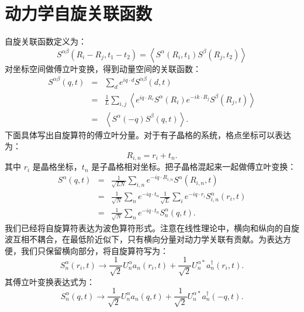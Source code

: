 \documentclass[UTF8]{ctexart}
\begin{document}
\section*{动力学自旋关联函数}
\noindent
自旋关联函数定义为：
\begin{equation}
S^{\alpha\beta}\left(R_{i}-R_{j},t_{1}-t_{2}\right)=\left\langle S^{\alpha}\left(R_{i},t_{1}\right)S^{\beta}\left(R_{j},t_{2}\right)\right\rangle 
\end{equation}
对坐标空间做傅立叶变换，得到动量空间的关联函数：
\begin{eqnarray}
S^{\alpha\beta}\left(q,t\right) & = & \sum_{d}e^{iq\cdot d}S^{\alpha\beta}\left(d,t\right)\nonumber \\
 & = & \frac{1}{L}\sum_{i,j}\left\langle e^{iq\cdot R_{i}}S^{\alpha}\left(R_{i}\right)e^{-ik\cdot R_{j}}S^{\beta}\left(R_{j},t\right)\right\rangle \nonumber \\
 & = & \left\langle S^{\alpha}\left(-q\right)S^{\beta}\left(q,t\right)\right\rangle .
\end{eqnarray}
下面具体写出自旋算符的傅立叶分量。对于有子晶格的系统，格点坐标可以表达为：
\begin{equation}
R_{i,n}=r_{i}+t_{n}.
\end{equation}
其中 $r_{i}$ 是晶格坐标，$t_{n}$ 是子晶格相对坐标。把子晶格混起来一起做傅立叶变换：
\begin{eqnarray}
S^{\alpha}\left(q,t\right) & = & \frac{1}{\sqrt{LN}}\sum_{i,n}e^{-iq\cdot R_{i,n}}S^{\alpha}\left(R_{i,n},t\right)\nonumber \\
 & = & \frac{1}{\sqrt{N}}\sum_{n}e^{-iq\cdot t_{n}}\frac{1}{\sqrt{L}}\sum_{i}e^{-iq\cdot r_{i}}S_{i,n}^{\alpha}\left(r_{i},t\right)\nonumber \\
 & = & \frac{1}{\sqrt{N}}\sum_{n}e^{-iq\cdot t_{n}}S_{n}^{\alpha}\left(q,t\right).
\end{eqnarray}
我们已经将自旋算符表达为波色算符形式。注意在线性理论中，横向和纵向的自旋波互相不耦合，在最低阶近似下，只有横向分量对动力学关联有贡献。为表达方便，我们只保留横向部分，将自旋算符写为：
\begin{equation}
S_{n}^{\alpha}\left(r_{i},t\right)\rightarrow\frac{1}{\sqrt{2}}U_{n}^{\alpha}a_{n}\left(r_{i},t\right)+\frac{1}{\sqrt{2}}U_{n}^{\alpha*}a_{n}^{\dagger}\left(r_{i},t\right).
\end{equation}
其傅立叶变换表达式为：
\begin{equation}
S_{n}^{\alpha}\left(q,t\right)\rightarrow\frac{1}{\sqrt{2}}U_{n}^{\alpha}a_{n}\left(q,t\right)+\frac{1}{\sqrt{2}}U_{n}^{\alpha*}a_{n}^{\dagger}\left(-q,t\right).
\end{equation}
\end{document}

